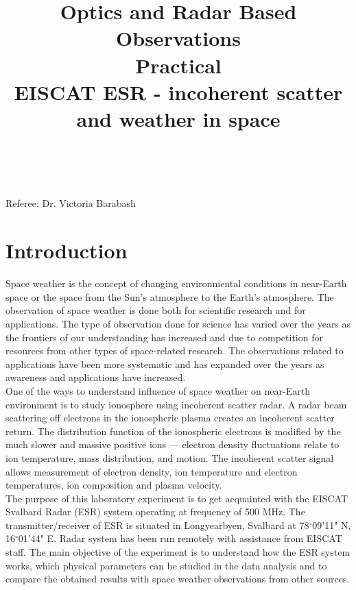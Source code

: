 \documentclass{article}
\title{\textbf {Optics and Radar Based Observations} \\ Practical\\ EISCAT ESR - incoherent scatter and weather in space} %
\author{\authorivan\\\authoranu}
\begin{document}
\maketitle %

\centerline{Referee: Dr. Victoria Barabash}

\setlength\parindent{0pt} %

\renewcommand{\labelenumi}{\alph{enumi}.} %
\clearpage

\tableofcontents

\listoffigures

\clearpage


\section{Introduction}
Space weather is the concept of changing environmental conditions in near-Earth space or the space from the Sun's atmosphere to the Earth's atmosphere. The observation of space weather is done both for scientific research and for applications. The type of observation done for science has varied over the years as the frontiers of our understanding has increased and due to competition for resources from other types of space-related research. The observations related to applications have been more systematic and has expanded over the years as awareness and applications have increased. \cite{Wiki:2012sw}\\
One of the ways to understand influence of space weather on near-Earth environment is to study ionosphere using incoherent scatter radar. A radar beam scattering off electrons in the ionospheric plasma creates an incoherent scatter return. The distribution function of the ionospheric electrons is modified by the much slower and massive positive ions — electron density fluctuations relate to ion temperature, mass distribution, and motion. The incoherent scatter signal allows measurement of electron density, ion temperature and electron temperatures, ion composition and plasma velocity. \cite{Wiki:2012is}
\\
The purpose of this laboratory experiment is to get acquainted with the EISCAT Svalbard Radar (ESR) system operating at frequency of 500 MHz. The transmitter/receiver of ESR is situated in Longyearbyen, Svalbard at 78$^{\circ}$09'11" N, 16$^{\circ}$01'44" E. Radar system has been run remotely with assistance from EISCAT staff. The main objective of the experiment is to understand how the ESR system works, which physical parameters can be studied in the data analysis and to compare the obtained results with space weather observations from other sources. \cite{Barabash:2011esr}
\end{document}
